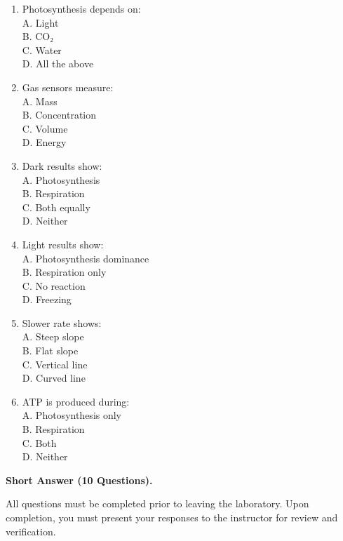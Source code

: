 \documentclass[
  letterpaper,
  DIV=11,
  numbers=noendperiod]{scrreprt}
\begin{document}
\begin{enumerate}
  A. Steeper slope\\
  B. Flat line\\
  C. No gas exchange\\
  D. Negative data
\item
  Photosynthesis depends on:\\
  A. Light\\
  B. CO₂\\
  C. Water\\
  D. All the above
\item
  Gas sensors measure:\\
  A. Mass\\
  B. Concentration\\
  C. Volume\\
  D. Energy
\item
  Dark results show:\\
  A. Photosynthesis\\
  B. Respiration\\
  C. Both equally\\
  D. Neither
\item
  Light results show:\\
  A. Photosynthesis dominance\\
  B. Respiration only\\
  C. No reaction\\
  D. Freezing
\item
  Slower rate shows:\\
  A. Steep slope\\
  B. Flat slope\\
  C. Vertical line\\
  D. Curved line
\item
  ATP is produced during:\\
  A. Photosynthesis only\\
  B. Respiration\\
  C. Both\\
  D. Neither
\end{enumerate}

\textbf{Short Answer (10 Questions).}

All questions must be completed prior to leaving the laboratory. Upon
completion, you must present your responses to the instructor for review
and verification.
\end{document}
